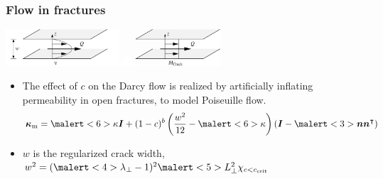 \documentclass{beamer}
\begin{document}

\begin{frame}
  \frametitle{Flow in fractures}

  \vspace{-1cm}
  \begin{center}
    \includegraphics[width=0.6\textwidth]{figs/flux}
  \end{center}
  \vspace{-5mm}

  \begin{itemize}
  \item The effect of $c$ on the Darcy flow is realized by
    artificially inflating permeability in open fractures, to model
    Poiseuille flow.
    \[
      \bm \kappa_\text{m} = \malert<6>{\kappa} \bm I + (1-c)^b \left(
        \frac{w^2}{12} - \malert<6>{\kappa}
      \right) (\bm I - \malert<3>{\bm n \bm n^\intercal})
    \]
  \item<2-> $w$ is the regularized crack width, $w^2 = (\malert<4>{\lambda_\perp} - 1)^2 \malert<5>{L_\perp^2} \chi_{c<c_\text{crit}}$
  \end{itemize}

  \begin{overlayarea}{\textwidth}{1cm}
    \begin{center}
    \end{center}
  \end{overlayarea}
\end{frame}
\end{document}
